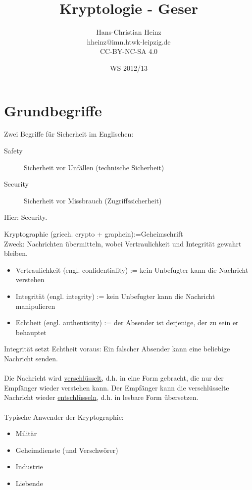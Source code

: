 \documentclass[a4paper,12pt]{article}
\title{Kryptologie - Geser}
\author{Hans-Christian Heinz\\
hheinz@imn.htwk-leipzig.de\\
CC-BY-NC-SA 4.0}
\date{WS 2012/13}
\begin{document}
\maketitle

\tableofcontents

\section{Grundbegriffe}

Zwei Begriffe für Sicherheit im Englischen:
\begin{description}
 \item[Safety] Sicherheit vor Unfällen (\glqq{}technische Sicherheit\grqq{})
 \item[Security] Sicherheit vor Missbrauch (\glqq{}Zugriffssicherheit\grqq{})
\end{description}

Hier: Security.

Kryptographie (griech. crypto + graphein):=Geheimschrift \\
Zweck: Nachrichten übermitteln, wobei Vertraulichkeit und Integrität gewahrt bleiben.\\
\begin{itemize}
 \item Vertraulichkeit (engl. confidentiality) := kein Unbefugter kann die Nachricht verstehen
 \item Integrität (engl. integrity) := kein Unbefugter kann die Nachricht manipulieren
 \item Echtheit (engl. authenticity) := der Absender ist derjenige, der zu sein er behauptet
\end{itemize}

Integrität setzt Echtheit voraus: Ein falscher Absender kann eine beliebige Nachricht senden.\\
\\
Die Nachricht wird \underline{verschlüsselt}, d.h. in eine Form gebracht, die nur der Empfänger wieder verstehen kann. Der Empfänger kann die verschlüsselte Nachricht wieder \underline{entschlüsseln}, d.h. in lesbare Form übersetzen.\\
\\
Typische Anwender der Kryptographie:
\begin{itemize}
 \item Militär
 \item Geheimdienste (und Verschwörer)
 \item Industrie
 \item Liebende
\end{itemize}
\end{document}
